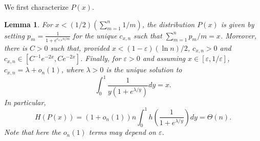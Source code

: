 \documentclass{daj}
\newtheorem{lemma}{Lemma}
\newcommand{\eps}{\varepsilon}
\begin{document}
We first characterize $P(x)$.

\begin{lemma}\label{lem:opt-dis}
    For $x < (1/2)(\sum_{m=1}^{n} 1/m)$, the distribution $P(x)$ is given by setting $p_m = \frac{1}{1+e^{c_{x,n} n/m}}$ for the unique $c_{x,n}$ such that $\sum_{m=1}^{n} p_m/m = x$. 
    Moreover, there is $C>0$ such that, provided $x < (1-\eps)(\ln n)/2$, $c_{x,n} > 0$ and $c_{x,n} \in [C^{-1}e^{-2x}, Ce^{-2x}]$. 
    Finally, for $\eps>0$ and assuming $x\in [\eps,1/\eps]$, $c_{x,n} = \lambda+o_n(1)$, where $\lambda > 0$ is the unique solution to 
    \[
        \int_{0}^{1} \frac{1}{y(1+e^{\lambda/y})} dy = x.
    \]
    In particular, 
    \begin{equation}\label{eq:ent-cal}
        H(P(x)) = (1+o_n(1)) n \int_{0}^{1} h\left(\frac{1}{1+e^{\lambda/y}}\right)dy = \Theta(n).
    \end{equation}
    Note that here the $o_n(1)$ terms may depend on $\eps$. 
\end{lemma}
\end{document}
